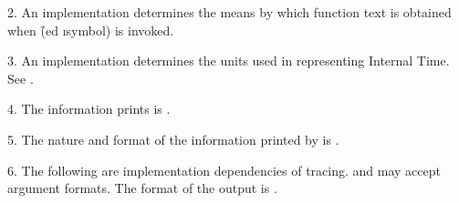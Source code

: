 \item{2.} An implementation determines the means by which
function text is obtained when \f{(ed \i{symbol})} is invoked.

\item{3.} An implementation determines the units used in representing
Internal Time.
See .

\item{4.} The information  prints is
.  
\item{5.} The nature and
format of the information printed by 
is .  
           
\item{6.} The following are implementation dependencies of
tracing.
\beginlist
{}  and  may accept 
 argument formats.  
 The format of the 
output is .
\endlist        
\endlist        
\endsubSection%

